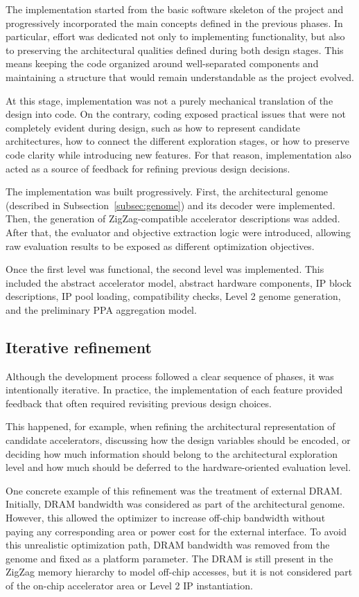 The implementation started from the basic software skeleton of the
project and progressively incorporated the main concepts defined in
the previous phases. In particular, effort was dedicated not only to
implementing functionality, but also to preserving the architectural
qualities defined during both design stages. This means keeping the
code organized around well-separated components and maintaining a
structure that would remain understandable as the project evolved.

At this stage, implementation was not a purely mechanical translation
of the design into code. On the contrary, coding exposed practical
issues that were not completely evident during design, such as how to
represent candidate architectures, how to connect the different
exploration stages, or how to preserve code clarity while introducing
new features. For that reason, implementation also acted as a source
of feedback for refining previous design decisions.

The implementation was built progressively. First, the architectural
genome (described in Subsection~\ref{subsec:genome}) and its decoder were 
implemented. Then, the generation of
ZigZag-compatible accelerator descriptions was added. After that, the
evaluator and objective extraction logic were introduced, allowing
raw evaluation results to be exposed as different optimization
objectives.

Once the first level was functional, the second level was
implemented. This included the abstract accelerator model, abstract
hardware components, IP block descriptions, IP pool loading,
compatibility checks, Level 2 genome generation, and the preliminary
PPA aggregation model.

\subsection{Iterative refinement}
Although the development process followed a clear sequence of phases,
it was intentionally iterative. In practice, the implementation of
each feature provided feedback that often required revisiting
previous design choices.

This happened, for example, when refining the architectural
representation of candidate accelerators, discussing how the design
variables should be encoded, or deciding how much information should
belong to the architectural exploration level and how much should be
deferred to the hardware-oriented evaluation level.

One concrete example of this refinement was the treatment of external
DRAM. Initially, DRAM bandwidth was considered as part of the
architectural genome. However, this allowed the optimizer to increase
off-chip bandwidth without paying any corresponding area or power
cost for the external interface. To avoid this unrealistic
optimization path, DRAM bandwidth was removed from the genome and
fixed as a platform parameter. The DRAM is still present in the
ZigZag memory hierarchy to model off-chip accesses, but it is not
considered part of the on-chip accelerator area or Level 2 IP
instantiation.

